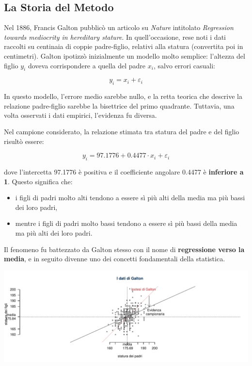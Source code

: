 \documentclass[
  11pt,
]{book}
\providecommand{\tightlist}{%
  \setlength{\itemsep}{0pt}\setlength{\parskip}{0pt}}
\theoremstyle{mytheoremstyle}
\theoremstyle{mydefstyle}
\begin{document}
\subsection{La Storia del Metodo}\label{la-storia-del-metodo}

Nel 1886, Francis Galton pubblicò un articolo su \emph{Nature} intitolato \emph{Regression towards mediocrity in hereditary stature}. In quell'occasione, rese noti i dati raccolti su centinaia di coppie padre-figlio, relativi alla statura (convertita poi in centimetri). Galton ipotizzò inizialmente un modello molto semplice: l'altezza del figlio \(y_i\) doveva corrispondere a quella del padre \(x_i\), salvo errori casuali:

\[
y_i = x_i + \varepsilon_i
\]

In questo modello, l'errore medio sarebbe nullo, e la retta teorica che descrive la relazione padre-figlio sarebbe la bisettrice del primo quadrante. Tuttavia, una volta osservati i dati empirici, l'evidenza fu diversa.

Nel campione considerato, la relazione stimata tra statura del padre e del figlio risultò essere:

\[
y_i = 97.1776 + 0.4477 \cdot x_i + \varepsilon_i
\]

dove l'intercetta 97.1776 è positiva e il coefficiente angolare 0.4477 è \textbf{inferiore a 1}. Questo significa che:

\begin{itemize}
\tightlist
\item
  i figli di padri molto alti tendono a essere sì più alti della media ma più bassi dei loro padri,
\item
  mentre i figli di padri molto bassi tendono a essere sì più bassi della media ma più alti dei loro padri.
\end{itemize}

Il fenomeno fu battezzato da Galton stesso con il nome di \textbf{regressione verso la media}, e in seguito divenne uno dei concetti fondamentali della statistica.

\begin{center}\includegraphics{Appunti_di_Statistica_2025_files/figure-latex/17-regressione-I-18-1} \end{center}
\end{document}
